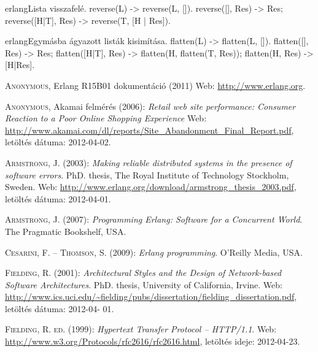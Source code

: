 \documentclass[12pt, a4paper, oneside]{book}
\begin{document}
\begin{code}{erlang}{Lista visszafelé.}
reverse(L) ->
  reverse(L, []).
reverse([], Res) ->
  Res;
reverse([H|T], Res) ->
  reverse(T, [H | Res]).
\end{code}

\newpage
\begin{code}{erlang}{Egymásba ágyazott listák kisimítása.}
flatten(L) -> flatten(L, []).
flatten([], Res) -> Res;
flatten([H|T], Res) ->
  flatten(H, flatten(T, Res));
flatten(H, Res) ->
  [H|Res].
\end{code}

\begin{thebibliography}{9}

{\scshape Anonymous}, Erlang R15B01 dokumentáció (2011) Web:
\url{http://www.erlang.org}.

{\scshape Anonymous}, Akamai felmérés (2006): \emph{Retail web site performance: Consumer Reaction to a Poor Online
Shopping Experience} Web:
\url{http://www.akamai.com/dl/reports/Site_Abandonment_Final_Report.pdf},
letöltés dátuma: 2012-04-02.

{\scshape Armstrong, J.} (2003): \emph{Making reliable distributed systems in the presence of software errors}. PhD.
thesis, The Royal Institute of Technology Stockholm, Sweden. Web:
\url{http://www.erlang.org/download/armstrong_thesis_2003.pdf}, letöltés
dátuma: 2012-04-01.

{\scshape Armstrong, J.} (2007): \emph{Programming Erlang: Software for a Concurrent World}. The Pragmatic
Bookshelf, USA.

{\scshape Cesarini, F. -- Thomson, S.} (2009): \emph{Erlang programming}.
O'Reilly Media, USA.

{\scshape Fielding, R.} (2001): \emph{Architectural Styles and the Design of Network-based Software
Architectures}. PhD. thesis, University of California, Irvine. Web:
\url{http://www.ics.uci.edu/~fielding/pubs/dissertation/fielding_dissertation.pdf}, letöltés dátuma: 2012-04-
01.

{\scshape Fielding, R. ed.} (1999): \emph{Hypertext Transfer Protocol --
HTTP/1.1}. Web: \url{http://www.w3.org/Protocols/rfc2616/rfc2616.html},
letöltés ideje: 2012-04-23.


\end{thebibliography}
\end{document}
